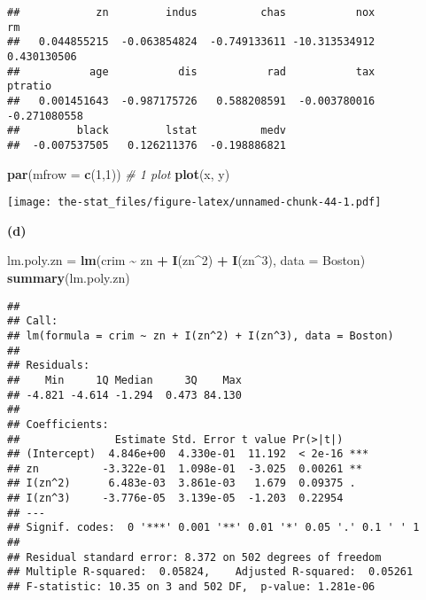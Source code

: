 \documentclass[
]{article}
\newenvironment{Shaded}{\begin{snugshade}}{\end{snugshade}}
\newcommand{\AttributeTok}[1]{\textcolor[rgb]{0.13,0.29,0.53}{#1}}
\newcommand{\CommentTok}[1]{\textcolor[rgb]{0.56,0.35,0.01}{\textit{#1}}}
\newcommand{\DecValTok}[1]{\textcolor[rgb]{0.00,0.00,0.81}{#1}}
\newcommand{\FunctionTok}[1]{\textcolor[rgb]{0.13,0.29,0.53}{\textbf{#1}}}
\newcommand{\NormalTok}[1]{#1}
\newcommand{\OtherTok}[1]{\textcolor[rgb]{0.56,0.35,0.01}{#1}}
\newcommand{\SpecialCharTok}[1]{\textcolor[rgb]{0.81,0.36,0.00}{\textbf{#1}}}
\begin{document}
\begin{verbatim}
##            zn         indus          chas           nox            rm 
##   0.044855215  -0.063854824  -0.749133611 -10.313534912   0.430130506 
##           age           dis           rad           tax       ptratio 
##   0.001451643  -0.987175726   0.588208591  -0.003780016  -0.271080558 
##         black         lstat          medv 
##  -0.007537505   0.126211376  -0.198886821
\end{verbatim}

\begin{Shaded}
\begin{Highlighting}[]
\FunctionTok{par}\NormalTok{(}\AttributeTok{mfrow =} \FunctionTok{c}\NormalTok{(}\DecValTok{1}\NormalTok{,}\DecValTok{1}\NormalTok{)) }\CommentTok{\# 1 plot}
\FunctionTok{plot}\NormalTok{(x, y)}
\end{Highlighting}
\end{Shaded}

\texttt{[image: the-stat\_files/figure-latex/unnamed-chunk-44-1.pdf]}

\textbf{(d)}

\begin{Shaded}
\begin{Highlighting}[]
\NormalTok{lm.poly.zn }\OtherTok{=} \FunctionTok{lm}\NormalTok{(crim }\SpecialCharTok{\textasciitilde{}}\NormalTok{ zn }\SpecialCharTok{+} \FunctionTok{I}\NormalTok{(zn}\SpecialCharTok{\^{}}\DecValTok{2}\NormalTok{) }\SpecialCharTok{+} \FunctionTok{I}\NormalTok{(zn}\SpecialCharTok{\^{}}\DecValTok{3}\NormalTok{), }\AttributeTok{data =}\NormalTok{ Boston)}
\FunctionTok{summary}\NormalTok{(lm.poly.zn)}
\end{Highlighting}
\end{Shaded}

\begin{verbatim}
## 
## Call:
## lm(formula = crim ~ zn + I(zn^2) + I(zn^3), data = Boston)
## 
## Residuals:
##    Min     1Q Median     3Q    Max 
## -4.821 -4.614 -1.294  0.473 84.130 
## 
## Coefficients:
##               Estimate Std. Error t value Pr(>|t|)    
## (Intercept)  4.846e+00  4.330e-01  11.192  < 2e-16 ***
## zn          -3.322e-01  1.098e-01  -3.025  0.00261 ** 
## I(zn^2)      6.483e-03  3.861e-03   1.679  0.09375 .  
## I(zn^3)     -3.776e-05  3.139e-05  -1.203  0.22954    
## ---
## Signif. codes:  0 '***' 0.001 '**' 0.01 '*' 0.05 '.' 0.1 ' ' 1
## 
## Residual standard error: 8.372 on 502 degrees of freedom
## Multiple R-squared:  0.05824,    Adjusted R-squared:  0.05261 
## F-statistic: 10.35 on 3 and 502 DF,  p-value: 1.281e-06
\end{verbatim}
\end{document}
